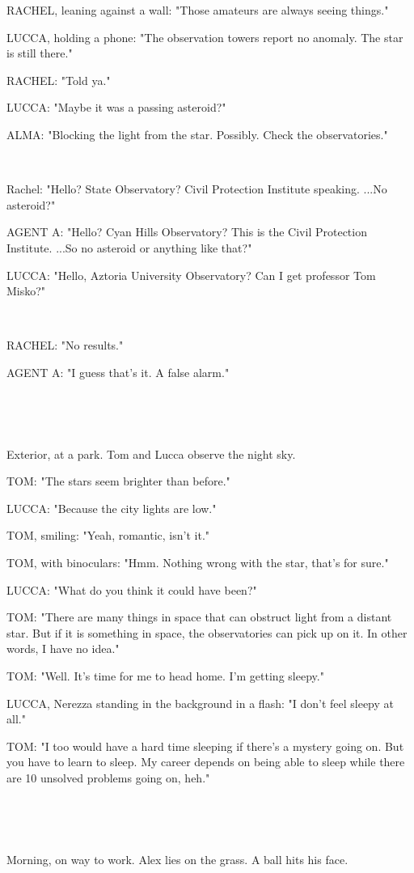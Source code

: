 \documentclass[11pt]{article}
\begin{document}
RACHEL, leaning against a wall: "Those amateurs are always seeing things."

LUCCA, holding a phone: "The observation towers report no anomaly. 
The star is still there."

RACHEL: "Told ya."

LUCCA: "Maybe it was a passing asteroid?"

ALMA: "Blocking the light from the star. Possibly. 
Check the observatories."

\ 

Rachel: "Hello? State Observatory? Civil Protection Institute speaking.
...No asteroid?"

AGENT A: "Hello? Cyan Hills Observatory? This is the Civil Protection Institute. 
...So no asteroid or anything like that?"

LUCCA: "Hello, Aztoria University Observatory? Can I get professor Tom Misko?"

\ 

RACHEL: "No results."

AGENT A: "I guess that's it. 
A false alarm."

\ 

\ 

Exterior, at a park. 
Tom and Lucca observe the night sky.

TOM: "The stars seem brighter than before."

LUCCA: "Because the city lights are low."

TOM, smiling: "Yeah, romantic, isn't it."

TOM, with binoculars: "Hmm. Nothing wrong with the star, that's for sure."

LUCCA: "What do you think it could have been?"

TOM: "There are many things in space that can obstruct light from a distant star. 
But if it is something in space, the observatories can pick up on it.
In other words, I have no idea."

TOM: "Well. It's time for me to head home.
I'm getting sleepy."

LUCCA, Nerezza standing in the background in a flash: "I don't feel sleepy at all."

TOM: "I too would have a hard time sleeping if there's a mystery going on.
But you have to learn to sleep.
My career depends on being able to sleep while there are 10 unsolved problems going on, heh."

\ 

\ 

Morning, on way to work.
Alex lies on the grass.
A ball hits his face.
\end{document}
